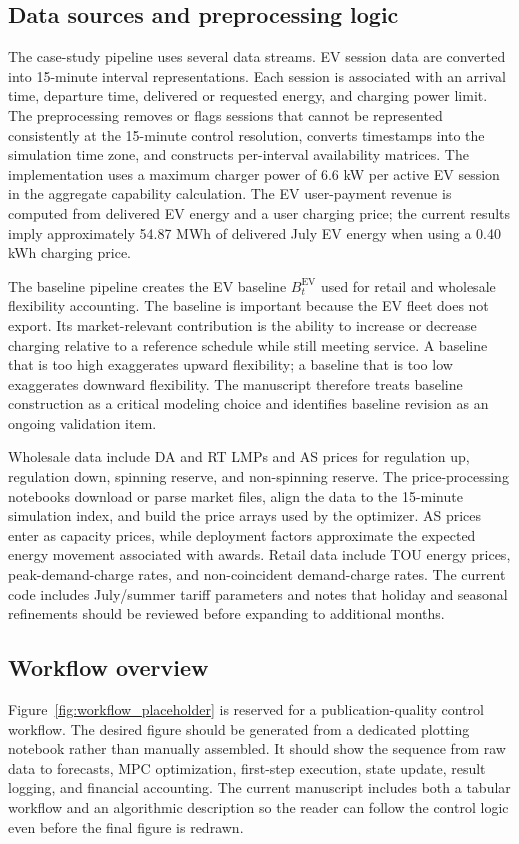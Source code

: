 \documentclass[final,5p,times]{elsarticle}
\newcommand{\EV}{\mathrm{EV}}
\begin{document}
\subsection{Data sources and preprocessing logic}
The case-study pipeline uses several data streams. EV session data are converted into 15-minute interval representations. Each session is associated with an arrival time, departure time, delivered or requested energy, and charging power limit. The preprocessing removes or flags sessions that cannot be represented consistently at the 15-minute control resolution, converts timestamps into the simulation time zone, and constructs per-interval availability matrices. The implementation uses a maximum charger power of 6.6 kW per active EV session in the aggregate capability calculation. The EV user-payment revenue is computed from delivered EV energy and a user charging price; the current results imply approximately 54.87 MWh of delivered July EV energy when using a 0.40 \/kWh charging price.

The baseline pipeline creates the EV baseline $B_t^{\EV}$ used for retail and wholesale flexibility accounting. The baseline is important because the EV fleet does not export. Its market-relevant contribution is the ability to increase or decrease charging relative to a reference schedule while still meeting service. A baseline that is too high exaggerates upward flexibility; a baseline that is too low exaggerates downward flexibility. The manuscript therefore treats baseline construction as a critical modeling choice and identifies baseline revision as an ongoing validation item.

Wholesale data include DA and RT LMPs and AS prices for regulation up, regulation down, spinning reserve, and non-spinning reserve. The price-processing notebooks download or parse market files, align the data to the 15-minute simulation index, and build the price arrays used by the optimizer. AS prices enter as capacity prices, while deployment factors approximate the expected energy movement associated with awards. Retail data include TOU energy prices, peak-demand-charge rates, and non-coincident demand-charge rates. The current code includes July/summer tariff parameters and notes that holiday and seasonal refinements should be reviewed before expanding to additional months.

\subsection{Workflow overview}
Figure~\ref{fig:workflow_placeholder} is reserved for a publication-quality control workflow. The desired figure should be generated from a dedicated plotting notebook rather than manually assembled. It should show the sequence from raw data to forecasts, MPC optimization, first-step execution, state update, result logging, and financial accounting. The current manuscript includes both a tabular workflow and an algorithmic description so the reader can follow the control logic even before the final figure is redrawn.
\end{document}
